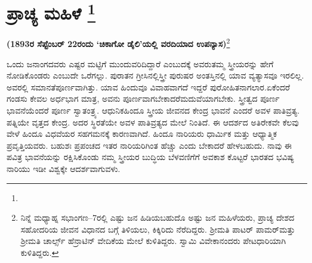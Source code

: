 
\chapter[ಪ್ರಾಚ್ಯ ಮಹಿಳೆ ]{ಪ್ರಾಚ್ಯ ಮಹಿಳೆ \protect\footnote{}}

\centerline{\textbf{(1893ರ ಸೆಪ್ಟೆಂಬರ್​ 22ರಂದು ‘ಚಿಕಾಗೋ ಡೈಲಿ’ಯಲ್ಲಿ ವರದಿಯಾದ ಉಪನ್ಯಾಸ)}\footnote{ ನಿನ್ನೆ ಮಧ್ಯಾಹ್ನ ಸಭಾಂಗಣ–7ರಲ್ಲಿ ಎಷ್ಟು ಜನ ಹಿಡಿಯಬಹುದೊ ಅಷ್ಟು ಜನ ಮಹಿಳೆಯರು, ಪ್ರಾಚ್ಯ ದೇಶದ ಸಹೋದರಿಯ ಜೀವನ ವಿಧಾನದ ಬಗ್ಗೆ ತಿಳಿಯಲು, ಕಿಕ್ಕಿರಿದು ನೆರೆದಿದ್ದರು. ಶ‍್ರೀಮತಿ ಪಾಟರ್​ ಪಾಮರ್​ ಮತ್ತು ಶ‍್ರೀಮತಿ ಚಾರ್ಲ್ಸ್​ ಹೆನ್ರಾಟಿನ್​ ವೇದಿಕೆಯ ಮೇಲೆ ಕುಳಿತಿದ್ದರು. ಸ್ವಾಮಿ ವಿವೇಕಾನಂದರು ಪೇಟಧಾರಿಯಾಗಿ ಕುಳಿತಿದ್ದರು.}}

ಒಂದು ಜನಾಂಗದವರು ಎಷ್ಟರ ಮಟ್ಟಿಗೆ ಮುಂದುವರಿದಿದ್ದಾರೆ ಎಂಬುದಕ್ಕೆ ಅವರು\break ತಮ್ಮ ಸ್ತ್ರೀಯರನ್ನು ಹೇಗೆ ನೋಡಿಕೊಂಡರು ಎಂಬುದೇ ಒರೆಗಲ್ಲು. ಪುರಾತನ ಗ್ರೀಸಿನಲ್ಲಿ\break ಸ್ತ್ರೀ ಪುರುಷರ ಅಂತಸ್ತಿನಲ್ಲಿ ಯಾವ ವ್ಯತ್ಯಾಸವೂ ಇರಲಿಲ್ಲ. ಅವರಲ್ಲಿ ಸಮಾನತೆ\break ಪೂರ್ಣವಾಗಿತ್ತು. ಯಾವ ಹಿಂದುವೂ ವಿವಾಹವಾಗದೆ ಇದ್ದರೆ ಪುರೋಹಿತನಾಗಲಾರ.\break ಏಕೆಂದರೆ ಗಂಡಸು ಕೇವಲ ಅರ್ಧಭಾಗ ಮಾತ್ರ, ಅವನು ಪೂರ್ಣವಾಗಬೇಕಾದರೆ\break ಮದುವೆಯಾಗಬೇಕು. ಸ್ತ್ರೀತ್ವದ ಪೂರ್ಣ ಭಾವನೆಯೆಂದರೆ ಪೂರ್ಣ ಸ್ವಾತಂತ್ರ್ಯ. ಆಧುನಿಕ\break ಹಿಂದೂ ಸ್ತ್ರೀಯ ಜೀವನದ ಕೇಂದ್ರ ಭಾವನೆ ಎಂದರೆ ಅವಳ ಪಾತಿವ್ರತ್ಯ. ಪತ್ನಿಯೇ ವೃತ್ತದ ಕೇಂದ್ರ. ಅದರ ಸ್ಥಿರತೆಯೇ ಅವಳ ಪಾತಿವ್ರತ್ಯದ ಮೇಲೆ ನಿಂತಿದೆ. ಈ ಆದರ್ಶದ ಅತಿರೇಕವೇ ಕೆಲವು ವೇಳೆ ಹಿಂದೂ ವಿಧವೆಯರ ಸಹಗಮನಕ್ಕೆ ಕಾರಣವಾಗಿದೆ. ಹಿಂದೂ ನಾರಿಯರು ಧಾರ್ಮಿಕ ಮತ್ತು ಆಧ್ಯಾತ್ಮಿಕ ಪ್ರವೃತ್ತಿಯವರು. ಬಹುಶಃ ಪ್ರಪಂಚದ ಇತರ ನಾರಿಯರಿಗಿಂತ ಹೆಚ್ಚು ಎಂದು ಬೇಕಾದರೆ ಹೇಳಬಹುದು. ನಾವು ಈ ಪವಿತ್ರ ಭಾವನೆಯನ್ನು ರಕ್ಷಿಸಿಕೊಂಡು ನಮ್ಮ ಸ್ತ್ರೀಯರ ಬುದ್ಧಿಯ ಬೆಳವಣಿಗೆಗೆ ಅವಕಾಶ ಕೊಟ್ಟರೆ ಭಾರತದ ಭವಿಷ್ಯ ನಾರಿಯು ಇಡೀ ವಿಶ್ವಕ್ಕೇ ಆದರ್ಶವಾಗುವಳು.

\vskip 6pt

